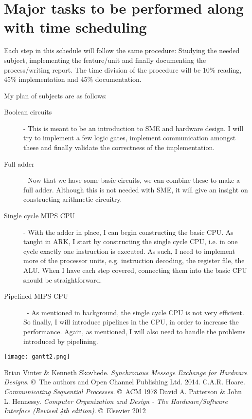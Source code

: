 \documentclass[a4paper]{article}
\renewcommand{\it}{\textit}
\begin{document}
\section*{Major tasks to be performed along with time scheduling}
Each step in this schedule will follow the same procedure: Studying the needed
subject, implementing the feature/unit and finally documenting the
process/writing report. The time division of the procedure will be 10\%
reading, 45\% implementation and 45\% documentation.

My plan of subjects are as follows:
\begin{description}
    \item[Boolean circuits] - This is meant to be an introduction to SME and
        hardware design. I will try to implement a few logic gates, implement
        communication amongst these and finally validate the correctness of the
        implementation.

    \item[Full adder] - Now that we have some basic circuits, we can combine
        these to make a full adder. Although this is not needed with SME, it
        will give an insight on constructing arithmetic circuitry.

    \item[Single cycle MIPS CPU] - With the adder in place, I can begin
        constructing the basic CPU. As taught in ARK, I start by constructing
        the single cycle CPU, i.e. in one cycle exactly one instruction is
        executed. As such, I need to implement more of the processor units,
        e.g. instruction decoding, the register file, the ALU. When I have each
        step covered, connecting them into the basic CPU should be
        straightforward.

    \item[Pipelined MIPS CPU] - As mentioned in background, the single cycle
        CPU is not very efficient. So finally, I will introduce pipelines in
        the CPU, in order to increase the performance. Again, as mentioned, I
        will also need to handle the problems introduced by pipelining.
\end{description}
\texttt{[image: gantt2.png]}

\begin{thebibliography}{9}
     Brian Vinter \& Kenneth Skovhede. \it{Synchronous Message
        Exchange for Hardware Designs}. \copyright\ The authors and Open
        Channel Publishing Ltd. 2014.
     C.A.R. Hoare. \it{Communicating Sequential Processes}.
        \copyright\ ACM 1978
     David A. Patterson \& John L. Hennessy. \it{Computer
        Organization and Design - The Hardware/Software Interface (Revised 4th
        edition)}.  \copyright\ Elsevier 2012
\end{thebibliography}
\end{document}
